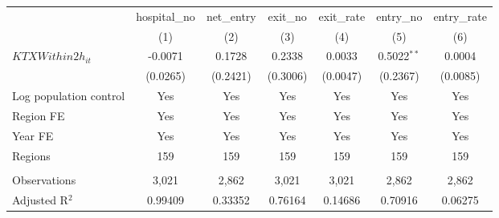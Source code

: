 \begingroup
\centering
\begin{tabular}{lcccccc}
   \toprule
                          & hospital\_no  & net\_entry  & exit\_no  & exit\_rate  & entry\_no     & entry\_rate \\    
                          & (1)           & (2)         & (3)       & (4)         & (5)           & (6)\\  
   \midrule 
   $KTXWithin2h_{it}$     & -0.0071       & 0.1728      & 0.2338    & 0.0033      & 0.5022$^{**}$ & 0.0004\\   
                          & (0.0265)      & (0.2421)    & (0.3006)  & (0.0047)    & (0.2367)      & (0.0085)\\   
   Log population control & Yes           & Yes         & Yes       & Yes         & Yes           & Yes\\  
   Region FE              & Yes           & Yes         & Yes       & Yes         & Yes           & Yes\\  
   Year FE                & Yes           & Yes         & Yes       & Yes         & Yes           & Yes\\  
   Regions                & 159           & 159         & 159       & 159         & 159           & 159\\  
    \\
   Observations           & 3,021         & 2,862       & 3,021     & 3,021       & 2,862         & 2,862\\  
   Adjusted R$^2$         & 0.99409       & 0.33352     & 0.76164   & 0.14686     & 0.70916       & 0.06275\\  
   \bottomrule
\end{tabular}
\par\endgroup

